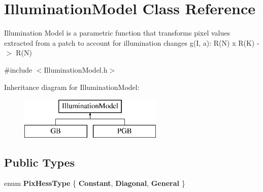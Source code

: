 \hypertarget{classIlluminationModel}{\section{Illumination\-Model Class Reference}
\label{classIlluminationModel}
}


Illumination Model is a parametric function that transforms pixel values extracted from a patch to account for illumination changes g(\-I, a)\-: R(\-N) x R(\-K) -\/$>$ R(\-N)  




{\ttfamily \#include $<$Illumination\-Model.\-h$>$}

Inheritance diagram for Illumination\-Model\-:\begin{figure}[H]
\begin{center}
\leavevmode
\includegraphics[height=2.000000cm]{classIlluminationModel}
\end{center}
\end{figure}
\subsection*{Public Types}
\begin{DoxyCompactItemize}
\item 
enum {\bfseries Pix\-Hess\-Type} \{ {\bfseries Constant}, 
{\bfseries Diagonal}, 
{\bfseries General}
 \}
\end{DoxyCompactItemize}
